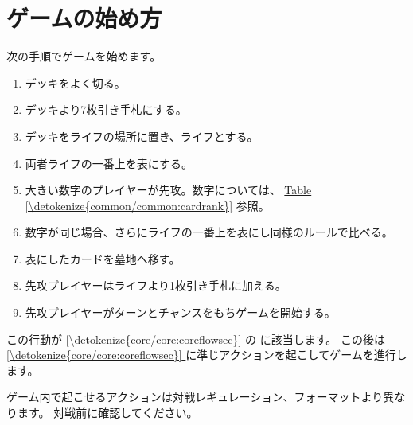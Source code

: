 \documentclass[letterpaper,10pt,dvipdfmx]{sphinxmanual}
\begin{document}
\section{ゲームの始め方}
\label{\detokenize{common/common:common-gamestart}}\label{\detokenize{common/common:id16}}
\sphinxAtStartPar
次の手順でゲームを始めます。
\begin{enumerate}
%
\item {} 
\sphinxAtStartPar
デッキをよく切る。

\item {} 
\sphinxAtStartPar
デッキより7枚引き手札にする。

\item {} 
\sphinxAtStartPar
デッキをライフの場所に置き、ライフとする。

\item {} 
\sphinxAtStartPar
両者ライフの一番上を表にする。

\item {} 
\sphinxAtStartPar
大きい数字のプレイヤーが先攻。数字については、 \hyperref[\detokenize{common/common:cardrank}]{Table \ref{\detokenize{common/common:cardrank}}} 参照。

\item {} 
\sphinxAtStartPar
数字が同じ場合、さらにライフの一番上を表にし同様のルールで比べる。

\item {} 
\sphinxAtStartPar
表にしたカードを墓地へ移す。

\item {} 
\sphinxAtStartPar
先攻プレイヤーはライフより1枚引き手札に加える。

\item {} 
\sphinxAtStartPar
先攻プレイヤーがターンとチャンスをもちゲームを開始する。

\end{enumerate}

\sphinxAtStartPar
この行動が
\hyperref[\detokenize{core/core:coreflowsec}]{\ref{\detokenize{core/core:coreflowsec}} } の
{\hyperref[\detokenize{core/core:core-gamestart}]{}} に該当します。
この後は
\hyperref[\detokenize{core/core:coreflowsec}]{\ref{\detokenize{core/core:coreflowsec}} }
に準じアクションを起こしてゲームを進行します。

\sphinxAtStartPar
ゲーム内で起こせるアクションは対戦レギュレーション、フォーマットより異なります。
対戦前に確認してください。
\end{document}
